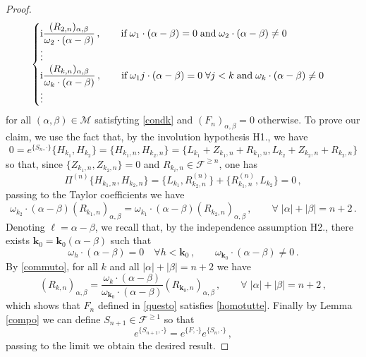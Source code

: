 \documentclass[reqno,11pt]{amsart}
\theoremstyle{plain}
\numberwithin{equation}{section}
\newcommand{\cF}{{\mathcal F}}
\newcommand{\im}{{\rm i}}
\newcommand{\cM}{{\mathcal M}}
\newcommand{\al}{{\alpha}}
\newcommand{\bt}{{\beta}}
\begin{document}
{\begin{proof}
\begin{equation}
\begin{cases}
			\im 	\dfrac{(R_{2,n})_{\al,\bt}}{\omega_2 \cdot (\al-\bt)}\,,\qquad \mbox{if}\;  \omega_1 \cdot (\al-\bt)=0 \;\mbox{and}\;   \omega_2 \cdot (\al-\bt)\neq 0\\
			\vdots
			\\
			\im 	\dfrac{(R_{k,n})_{\al,\bt}}{\omega_k \cdot (\al-\bt)}\,,\qquad \mbox{if}\;  \omega_1j\cdot (\al-\bt)=0 \; \forall j< k \;\mbox{and}\;   \omega_k \cdot (\al-\bt)\neq 0\\
			\vdots
		\end{cases}
	\end{equation}
	for all $(\al,\bt) \in \cM$ satisfyting \eqref{condk} and  $(F_n)_{\al,\bt}=0$ otherwise.
	To prove our claim, we use the fact that, by the involution hypothesis H1., we have 
	\[
	0= e^{\{S_n,\cdot \}} \{H_{k_1},H_{k_2}\}= \{H_{k_1,n},H_{k_2,n}\}=\{ L_{k_1}  + Z_{k_1,n}+ R_{k_1,n},L_{k_2}  + Z_{k_2,n}+ R_{k_2,n}\}
	\]
	so that, since $\{Z_{k_1,n},Z_{k_2,n}\}=0$ and $R_{k_i,n} \in \cF^{\geq n}$, one has 
	\[
	\Pi^{(n)} \{H_{k_1,n},H_{k_2,n}\} =\{L_{k_1}, R_{k_2,n}^{(n)}\} + \{R_{k_1,n}^{(n)}, L_{k_2}\}=0\,,
	\]
	passing to the Taylor coefficients we have
	\begin{equation}
		\label{commuto}
		\omega_{k_2} \cdot (\al-\bt) (R_{k_1,n})_{\al,\bt} = \omega_{k_1} \cdot (\al-\bt) (R_{k_2,n})_{\al,\bt} \,,\qquad \forall \; |\al|+|\bt| = n+2\,.
	\end{equation}
	Denoting $\ell= \al-\bt$, we recall that, by the independence assumption H2., there exists ${\mathbf k}_0 = {\mathbf k}_0(\al-\bt)$ such that
	\[
	\omega_{h} \cdot (\al-\bt) =0\quad  \forall h< {\mathbf k}_0\,,\qquad  \omega_{{\mathbf k}_0}\cdot (\al-\bt) \neq 0\,.
	\]
	By \eqref{commuto}, for all $k$ and all $ |\al|+|\bt| = n+2$ we have
	\[
	(R_{k,n})_{\al,\bt} =%
	\frac{\omega_{k} \cdot (\al-\bt)}{\omega_{{\mathbf k}_0}\cdot (\al-\bt)} (R_{{\mathbf k}_0,n})_{\al,\bt} \,,\qquad \forall \; |\al|+|\bt| = n+2\,,
	\]
	which shows that $F_n$ defined in \eqref{questo} satisfies \eqref{homotutte}.
	Finally by Lemma \ref{compo} we can define $S_{n+1}\in \cF^{\geq 1}$ so that
	\[
	e^{\{S_{n+1},\cdot\}}= e^{\{F,\cdot \} }e^{\{S_n,\cdot\}}\,,
	\]
	passing to the limit we obtain the desired result.
\end{proof}
}
\end{document}
